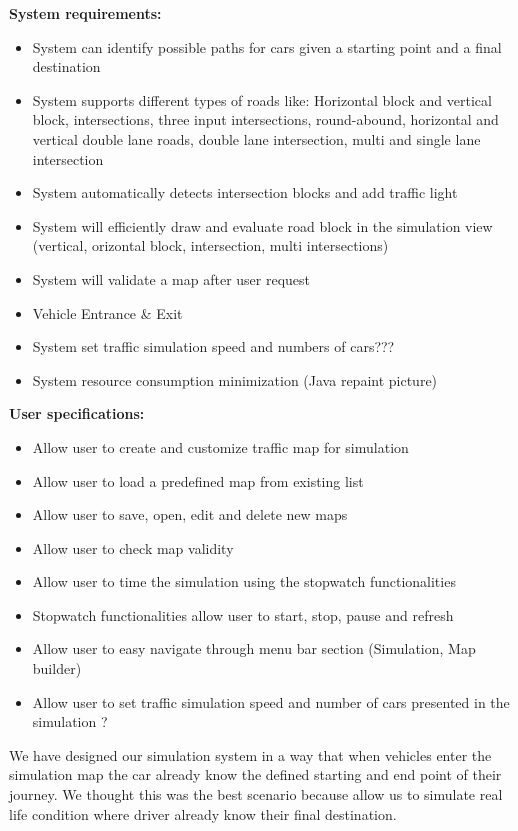 \documentclass[oneside]{article}
\begin{document}
\textbf {System requirements:}
\begin{itemize}
  \item System can identify possible paths for cars given a starting point and a final destination
  \item System supports different types of roads like: Horizontal block and vertical block, intersections, three input intersections, round-abound, horizontal and vertical double lane roads, double lane intersection, multi and single lane intersection
  \item System automatically detects intersection blocks and add traffic light 
  \item System will efficiently draw and evaluate road block in the simulation view (vertical, orizontal block, intersection, multi intersections)
  \item System will validate a map after user request 
  \item Vehicle Entrance \& Exit
  \item System set traffic simulation speed and numbers of cars???
  \item System resource consumption minimization (Java repaint picture)
 \end{itemize}
 
\textbf{User specifications:} 

\begin{itemize}
  \item Allow user to create and customize traffic map for simulation
  \item Allow user to load a predefined map from existing list
  \item Allow user to save, open, edit and delete new maps
  \item Allow user to check map validity 
  \item Allow user to time the simulation using the stopwatch functionalities
  \item Stopwatch functionalities allow user to start, stop, pause and refresh
  \item Allow user to easy navigate through menu bar section (Simulation, Map builder)
  \item Allow user to set traffic simulation speed and number of cars presented in the simulation ?
 	  	  
 \end{itemize}

\noindent  We have designed our simulation system in a way that when vehicles enter the simulation map the car already know the defined starting and end point of their journey. We thought this was the best scenario because allow us to simulate real life condition where driver already know their final destination. 
\newline
\end{document}
